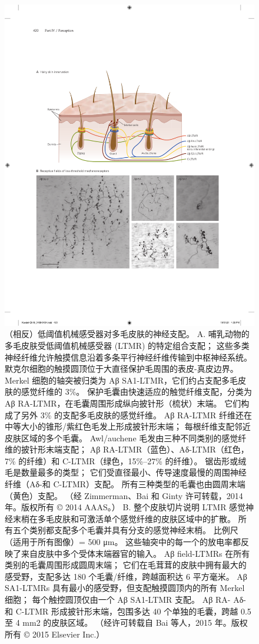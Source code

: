 \begin{figure}[htbp]
	\centering
	\includegraphics[width=1.0\linewidth]{chap18/fig_18_8}
	\caption{（相反）低阈值机械感受器对多毛皮肤的神经支配。 
		A. 哺乳动物的多毛皮肤受低阈值机械感受器 (LTMR) 的特定组合支配； 这些多类神经纤维允许触摸信息沿着多条平行神经纤维传输到中枢神经系统。 
		默克尔细胞的触摸圆顶位于大直径保护毛周围的表皮-真皮边界。 
		Merkel 细胞的轴突被归类为 Aβ SA1-LTMR，它们约占支配多毛皮肤的感觉纤维的 3\%。 
		保护毛囊由快速适应的触觉纤维支配，分类为 Aβ RA-LTMR，在毛囊周围形成纵向披针形（梳状）末端。 
		它们构成了另外 3\% 的支配多毛皮肤的感觉纤维。 
		Aβ RA-LTMR 纤维还在中等大小的锥形/紫红色毛发上形成披针形末端； 每根纤维支配邻近皮肤区域的多个毛囊。 
		Awl/auchene 毛发由三种不同类别的感觉纤维的披针形末端支配； Aβ RA-LTMR（蓝色）、Aδ-LTMR（红色，7\% 的纤维）和 C-LTMR（绿色，15\%–27\% 的纤维）。 
		锯齿形或绒毛是数量最多的类型； 它们受直径最小、传导速度最慢的周围神经纤维（Aδ-和 C-LTMR）支配。 
		所有三种类型的毛囊也由圆周末端（黄色）支配。 （经 Zimmerman、Bai 和 Ginty 许可转载，2014 年。版权所有 © 2014 AAAS。）
		B. 整个皮肤切片说明 LTMR 感觉神经末梢在多毛皮肤和可激活单个感觉纤维的皮肤区域中的扩散。 
		所有五个类别都支配多个毛囊并具有分支的感觉神经末梢。 
		比例尺（适用于所有图像）= 500 μm。 
		这些轴突中的每一个的放电率都反映了来自皮肤中多个受体末端器官的输入。 
		Aβ field-LTMRs 在所有类别的毛囊周围形成圆周末端； 它们在毛茸茸的皮肤中拥有最大的感受野，支配多达 180 个毛囊/纤维，跨越面积达 6 平方毫米。 
		Aβ SA1-LTMRs 具有最小的感受野，但支配触摸圆顶内的所有 Merkel 细胞； 每个触控圆顶仅由一个 Aβ SA1-LTMR 支配。 
		Aβ RA- Aδ- 和 C-LTMR 形成披针形末端，包围多达 40 个单独的毛囊，跨越 0.5 至 4 mm2 的皮肤区域。 （经许可转载自 Bai 等人，2015 年。版权所有 © 2015 Elsevier Inc.）}
	\label{fig:18_8}
\end{figure}

